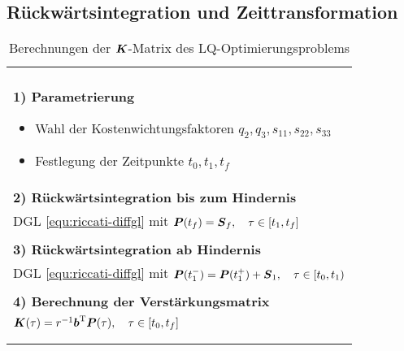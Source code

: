 \subsection{Rückwärtsintegration und Zeittransformation} \label{sec:rueckwaertsintegration}
\begin{table}[t]
\centering
\begin{tabular}{p{\columnwidth}}
\hline \\
\textbf{1) Parametrierung}
\begin{itemize}
\item Wahl der Kostenwichtungsfaktoren $q_2, q_3, s_{11}, s_{22}, s_{33}$
\item Festlegung der Zeitpunkte $t_0, t_1, t_f$
\end{itemize}
\\

\textbf{2) Rückwärtsintegration bis zum Hindernis} \\ 
\quad DGL \eqref{equ:riccati-diffgl} mit $\boldsymbol{P}(t_f) = \boldsymbol{S}_f, \quad \tau \in [t_1, t_f]$
\\
\\


\textbf{3) Rückwärtsintegration ab Hindernis} \\ 
\quad DGL \eqref{equ:riccati-diffgl} mit $\boldsymbol{P}(t_1^-)= \boldsymbol{P}(t_1^+) + \boldsymbol{S}_1, \quad \tau \in [t_0, t_1)$
\\
\\

\textbf{4) Berechnung der Verstärkungsmatrix} \\
\quad $\boldsymbol{K}(\tau) = r^{-1} \boldsymbol{b}^{{\rm T}} \boldsymbol{P}(\tau), \quad \tau \in [t_0, t_f]$
\\
\\

\hline \\
\end{tabular}
\caption{Berechnungen der $\boldsymbol{K}$-Matrix des LQ-Optimierungsproblems}
\label{tab:bestimmungKMatrix}
\end{table}
